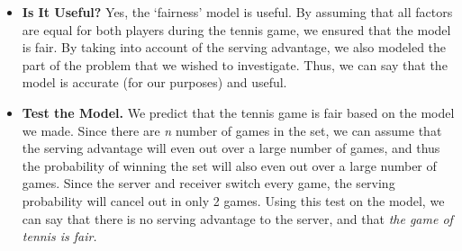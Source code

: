 \documentclass[12pt]{article}
\begin{document}
\begin{itemize}
\item \textbf{Is It Useful?} Yes, the `fairness' model is useful. By assuming that all factors are equal for both players during the tennis game, we ensured that the model is fair. By taking into account of the serving advantage, we also modeled the part of the problem that we wished to investigate. Thus, we can say that the model is accurate (for our purposes) and useful.
\item \textbf{Test the Model.} We predict that the tennis game is fair based on the model we made. Since there are \emph{n} number of games in the set, we can assume that the serving advantage will even out over a large number of games, and thus the probability of winning the set will also even out over a large number of games. Since the server and receiver switch every game, the serving probability will cancel out in only 2 games. Using this test on the model, we can say that there is no serving advantage to the server, and that \emph{the game of tennis is fair.}
\end{itemize}
\end{document}
